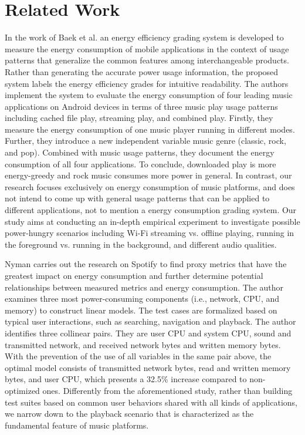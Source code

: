 \section{Related Work}\label{sec:related}
In the work of Baek et al. \cite{baek2018energy} an energy efficiency grading system is developed to measure the {\color{blue}energy consumption} of mobile applications in the context of usage patterns that generalize the common features among interchangeable products. Rather than generating the accurate power usage information, the proposed system labels the energy efficiency grades for intuitive readability. The authors implement the system to evaluate the energy consumption of four leading music applications on Android devices in terms of three music play usage patterns including cached file play, streaming play, and combined play. Firstly, they measure the energy consumption of one music player running in different modes. Further, they introduce a new independent variable music genre (\ie classic, rock, and pop). Combined with music usage patterns, they document the energy consumption of all four applications. To conclude, downloaded play is more energy-greedy and rock music consumes more power in general. In contrast, our research focuses exclusively on energy consumption of music platforms, and does not intend to come up with general usage patterns that can be applied to different applications, not to mention a energy consumption grading system. Our study aims at conducting an in-depth empirical experiment to investigate possible power-hungry scenarios {\color{blue}including Wi-Fi streaming vs. offline playing, running in the foreground vs. running in the background, and different audio qualities}. 

{\color{blue}Nyman \cite{nyman2020estimating} carries out the research on Spotify to find proxy metrics that have the greatest impact on energy consumption and further determine potential relationships between measured metrics and energy consumption. The author examines three most power-consuming components (i.e., network, CPU, and memory) to construct linear models. The test cases are formalized based on typical user interactions, such as searching, navigation and playback. The author identifies three collinear pairs. They are user CPU and system CPU, sound and transmitted network, and received network bytes and written memory bytes. With the prevention of the use of all variables in the same pair above, the optimal model consists of transmitted network bytes, read and written memory bytes, and user CPU, which presents a 32.5\% increase compared to non-optimized ones.} Differently from the aforementioned study, rather than building test suites based on common user behaviors shared with all kinds of applications, we narrow down to the playback scenario that is characterized as the fundamental feature of music platforms. 

